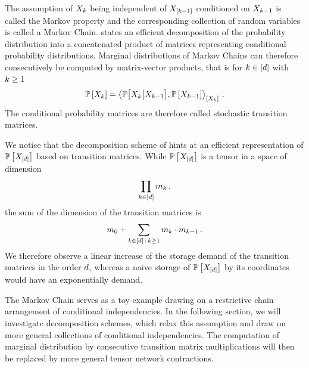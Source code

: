 The assumption of $X_{k}$ being independent of $X_{[k-1]}$ conditioned on $X_{k-1}$ is called the Markov property and the corresponding collection of random variables is called a Markov Chain.
 states an efficient decomposition of the probability distribution into a concatenated product of matrices representing conditional probability distributions.
Marginal distributions of Markov Chains can therefore consecutively be computed by matrix-vector products, that is for $k\in[d]$ with $k\geq1$
\begin{align*}
    \mathbb{P}\left[X_{k}\right]
    = \left\langle \mathbb{P}\big[X_{k}\big|X_{k-1}\big],\mathbb{P}\left[X_{k-1}\right]\right\rangle_{\left[ X_{k} \right]} \, .
\end{align*}
The conditional probability matrices are therefore called stochastic transition matrices.

We notice that the decomposition scheme of  hints at an efficient representation of $\mathbb{P}\left[X_{[d]}\right]$ based on transition matrices.
While $\mathbb{P}\left[X_{[d]}\right]$ is a tensor in a space of dimension
\begin{align*}
    \prod_{k\in[d]} m_{k} \, ,
\end{align*}
the sum of the dimension of the transition matrices is
\begin{align*}
    m_{0} + \sum_{k\in[d]\,:\,k\geq 1} m_{k}\cdot m_{k-1} \, .
\end{align*}
We therefore observe a linear increase of the storage demand of the transition matrices in the order $d$, whereas a naive storage of $\mathbb{P}\left[X_{[d]}\right]$ by its coordinates would have an exponentially demand.

The Markov Chain serves as a toy example drawing on a restrictive chain arrangement of conditional independencies.
In the following section, we will investigate decomposition schemes, which relax this assumption and draw on more general collections of conditional independencies.
The computation of marginal distribution by consecutive transition matrix multiplications will then be replaced by more general tensor network contractions.




\label{sec:graphicalModels}

